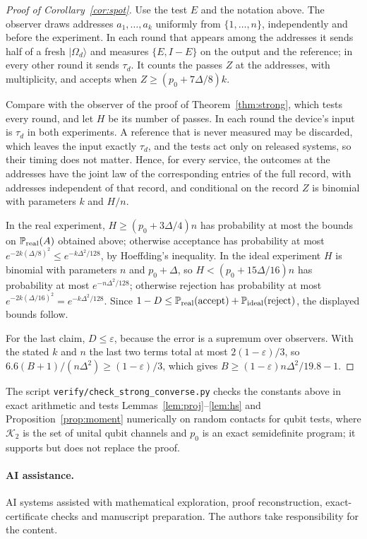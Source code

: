 \documentclass[11pt]{article}
\theoremstyle{definition}
\theoremstyle{remark}
\newcommand{\K}{\mathcal K}
\newcommand{\Prob}{\mathbb P}
\newcommand{\ket}[1]{\lvert#1\rangle}
\newcommand{\eps}{\varepsilon}
\begin{document}
\begin{proof}[Proof of Corollary~\ref{cor:spot}]
Use the test $E$ and the notation above. The observer draws addresses $a_1,\dots,a_k$ uniformly from $\{1,\dots,n\}$, independently and before the experiment. In each round that appears among the addresses it sends half of a fresh $\ket{\Omega_d}$ and measures $\{E,I-E\}$ on the output and the reference; in every other round it sends $\tau_d$. It counts the passes $Z$ at the addresses, with multiplicity, and accepts when $Z\ge(p_0+7\Delta/8)k$.

Compare with the observer of the proof of Theorem~\ref{thm:strong}, which tests every round, and let $H$ be its number of passes. In each round the device's input is $\tau_d$ in both experiments. A reference that is never measured may be discarded, which leaves the input exactly $\tau_d$, and the tests act only on released systems, so their timing does not matter. Hence, for every service, the outcomes at the addresses have the joint law of the corresponding entries of the full record, with addresses independent of that record, and conditional on the record $Z$ is binomial with parameters $k$ and $H/n$.

In the real experiment, $H\ge(p_0+3\Delta/4)n$ has probability at most the bounds on $\Prob_{\rm real}(A)$ obtained above; otherwise acceptance has probability at most $e^{-2k(\Delta/8)^2}\le e^{-k\Delta^2/128}$, by Hoeffding's inequality. In the ideal experiment $H$ is binomial with parameters $n$ and $p_0+\Delta$, so $H<(p_0+15\Delta/16)n$ has probability at most $e^{-n\Delta^2/128}$; otherwise rejection has probability at most $e^{-2k(\Delta/16)^2}=e^{-k\Delta^2/128}$. Since $1-D\le\Prob_{\rm real}(\text{accept})+\Prob_{\rm ideal}(\text{reject})$, the displayed bounds follow.

For the last claim, $D\le\eps$, because the error is a supremum over observers. With the stated $k$ and $n$ the last two terms total at most $2(1-\eps)/3$, so $6.6(B+1)/(n\Delta^2)\ge(1-\eps)/3$, which gives $B\ge(1-\eps)n\Delta^2/19.8-1$.
\end{proof}

The script \texttt{verify/check\_strong\_converse.py} checks the constants above in exact arithmetic and tests Lemmas~\ref{lem:proj}--\ref{lem:hs} and Proposition~\ref{prop:moment} numerically on random contacts for qubit tests, where $\K_2$ is the set of unital qubit channels and $p_0$ is an exact semidefinite program; it supports but does not replace the proof.

\paragraph{AI assistance.}
AI systems assisted with mathematical exploration, proof reconstruction, exact-certificate checks and manuscript preparation. The authors take responsibility for the content.
\end{document}
